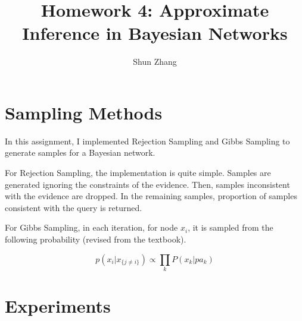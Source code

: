 \documentclass[11pt]{article}
\title{Homework 4: Approximate Inference in Bayesian Networks}
\author{Shun Zhang}
\date{}
\begin{document}
\maketitle

\section{Sampling Methods}

In this assignment, I implemented Rejection Sampling and Gibbs
Sampling to generate samples for a Bayesian network. 

For Rejection Sampling, the implementation is quite simple. Samples
are generated ignoring the constraints of the evidence. Then, samples
inconsistent with the evidence are dropped. In the remaining samples,
proportion of samples consistent with the query is returned.

For Gibbs Sampling, in each iteration, for node $x_i$, it is sampled
from the following probability (revised from the textbook).

\begin{equation}
p(x_i|x_{\{j \not = i\}}) \propto \prod_k P(x_k|pa_k)
\end{equation}

\section{Experiments}
\end{document}

